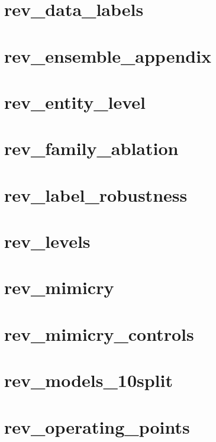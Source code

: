 \documentclass{article}
\begin{document}
\section*{rev\_data\_labels}
\resizebox{\linewidth}{!}{}
\clearpage
\section*{rev\_ensemble\_appendix}
\resizebox{\linewidth}{!}{}
\clearpage
\section*{rev\_entity\_level}
\resizebox{\linewidth}{!}{}
\clearpage
\section*{rev\_family\_ablation}
\resizebox{\linewidth}{!}{}
\clearpage
\section*{rev\_label\_robustness}
\resizebox{\linewidth}{!}{}
\clearpage
\section*{rev\_levels}
\resizebox{\linewidth}{!}{}
\clearpage
\section*{rev\_mimicry}
\resizebox{\linewidth}{!}{}
\clearpage
\section*{rev\_mimicry\_controls}
\resizebox{\linewidth}{!}{}
\clearpage
\section*{rev\_models\_10split}
\resizebox{\linewidth}{!}{}
\clearpage
\section*{rev\_operating\_points}
\resizebox{\linewidth}{!}{}
\clearpage
\end{document}
